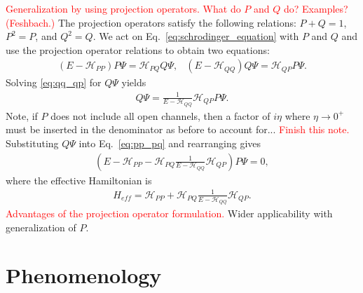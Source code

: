\documentclass[preprintnumbers,floatfix,aps,prc,preprint,nofootinbib]{revtex4-1}
\begin{document}
\textcolor{red}{Generalization by using projection operators. What do $P$ and $Q$ do? Examples? (Feshbach.)} The projection operators satisfy the following relations: $P+Q=1$, $P^2 = P$, and $Q^2 = Q$. We act on Eq.~\ref{eq:schrodinger_equation} with $P$ and $Q$ and use the projection operator relations to obtain two equations:
%
\begin{subequations}
	\label{eq:intermediate_effective_hamiltonian_equations}
	\begin{eqnarray}
		\label{eq:pp_pq}
		(E - \mathcal{H}_{PP}) P \Psi = \mathcal{H}_{PQ} Q \Psi,
	\end{eqnarray}
	\begin{eqnarray}
		\label{eq:qq_qp}
		(E - \mathcal{H}_{QQ}) Q \Psi = \mathcal{H}_{QP} P \Psi.
	\end{eqnarray}
\end{subequations}
%
Solving \ref{eq:qq_qp} for $Q \Psi$ yields
%
\begin{eqnarray}
	\label{eq:q_psi}
	Q \Psi = \frac{1}{E - \mathcal{H}_{QQ}} \mathcal{H}_{QP} P \Psi.
\end{eqnarray}
%
Note, if $P$ does not include all open channels, then a factor of $i \eta$ where $\eta \rightarrow 0^+$ must be inserted in the denominator as before to account for... \textcolor{red}{Finish this note.} Substituting $Q \Psi$ into Eq.~\ref{eq:pp_pq} and rearranging gives
%
\begin{eqnarray}
	\label{p_psi}
	(E - \mathcal{H}_{PP} - \mathcal{H}_{PQ} \frac{1}{E - \mathcal{H}_{QQ}} \mathcal{H}_{QP}) P \Psi = 0,
\end{eqnarray}
%
where the effective Hamiltonian is
%
\begin{eqnarray}
	\label{eq:effective_hamiltonian}
	H_{eff} = \mathcal{H}_{PP} + \mathcal{H}_{PQ} \frac{1}{E - \mathcal{H}_{QQ}} \mathcal{H}_{QP}.
\end{eqnarray}
%
%
\textcolor{red}{Advantages of the projection operator formulation.} Wider applicability with generalization of $P$.	


\section{Phenomenology}
\label{sec:phenomenology}
\end{document}
